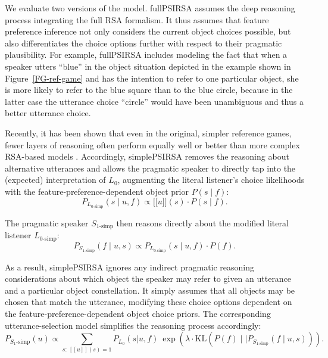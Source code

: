 \documentclass[11pt,a4paper]{article}
\newcommand{\sem}[1]{\mbox{$[\![$#1$]\!]$}}
\begin{document}
We evaluate two versions of the model. 
fullPSIRSA assumes the deep reasoning process integrating the full RSA formalism.  
It thus assumes that feature preference inference not only considers the current object choices possible, but also differentiates the choice options further with respect to their pragmatic plausibility. 
For example, fullPSIRSA includes modeling the fact that when a speaker utters ``blue'' in the object situation depicted in the example shown in Figure~\ref{FG-ref-game} and has the intention to refer to one particular object, she is more likely to refer to the blue square than to the blue circle, because in the latter case the utterance choice ``circle'' would have been unambiguous and thus a better utterance choice.


Recently, it has been shown that even in the original, simpler reference games, fewer layers of reasoning often perform equally well or better than more complex RSA-based models \cite{sikos2019}.
Accordingly, simplePSIRSA removes the reasoning about alternative utterances and allows the pragmatic speaker to directly tap into the (expected) interpretation of $L_0$, augmenting the literal listener's choice likelihoods with the feature-preference-dependent object prior $P(s\mid f)$:
\begin{equation}
P_{L_{0\textrm{-simp}}}(s\mid u,f) \propto \sem{$u$}(s) \cdot P(s\mid f).
\end{equation}

The pragmatic speaker $S_{1\textrm{-simp}}$ then reasons directly about the modified literal listener $L_{0\textrm{-simp}}$: 
\begin{equation}
P_{S_{1\textrm{-simp}}}(f\mid u,s) \propto P_{L_{0\textrm{-simp}}}(s\mid u,f) \cdot P(f).
\end{equation}

As a result, simplePSIRSA ignores any indirect pragmatic reasoning considerations about which object the speaker may refer to given an utterance and a particular object constellation.
It simply assumes that all objects may be chosen that match the utterance, modifying these choice options dependent on the feature-preference-dependent object choice priors. The corresponding utterance-selection model simplifies the reasoning process accordingly:
\begin{equation}
P_{S_1\textrm{-simp}}(u) \propto \sum_{s:\  [\![u]\!](s)=1} P_{L_0}(s|u,f)\ \exp(\lambda \cdot \textrm{KL}(P(f)\mid\mid P_{S_{1\textrm{-simp}}}(f\mid u,s))).
\label{eq:kldivlambdasimp}
\end{equation}
\end{document}
